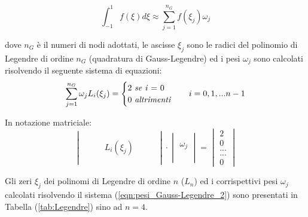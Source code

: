 \documentclass[12pt]{article} %
\begin{document}
\begin{equation}
    \int_{-1}^{1} f(\xi)d\xi\approx\sum_{j=1}^{n_G} f(\xi_{j})\omega_{j}
    \label{eqn:Gauss-Legendre_1}
\end{equation}

\noindent dove $n_G$ è il numeri di nodi adottati, le ascisse $\xi_{j}$ sono le radici del polinomio di Legendre di ordine $n_G$ (quadratura di Gauss-Legendre) ed i pesi $\omega_j$ sono calcolati risolvendo il seguente sistema di equazioni:
\begin{align}
    \sum_{j=1}^{n_G} \omega_j L_i(\xi_j) = \begin{cases}\textrm{2 \textit{se i} = 0}\\\textrm{0 \textit{altrimenti}}\end{cases} && i = 0, 1, ... n-1
    \label{eqn:pesi_Gauss-Legendre_1}
\end{align}

\noindent In notazione matriciale:
\begin{equation}
    \begin{vmatrix} & & & &  & &\\ & & & & & & \\ & & &L_i(\xi_j)& &  &\\ & & & & & &\\ & & & & & & \end{vmatrix}\cdot\begin{vmatrix}\\\\\omega_j\\\\\\\end{vmatrix}=\begin{vmatrix}2\\0\\...\\...\\0\end{vmatrix}
    \label{eqn:pesi_Gauss-Legendre_2}
\end{equation}

\noindent Gli zeri $\xi_j$ dei polinomi di Legendre di ordine $n$ ($L_n$) ed i corrispettivi pesi $\omega_j$ calcolati risolvendo il sistema (\ref{eqn:pesi_Gauss-Legendre_2}) sono presentati in Tabella (\ref{tab:Legendre}) sino ad $n = 4$. 
\end{document}
